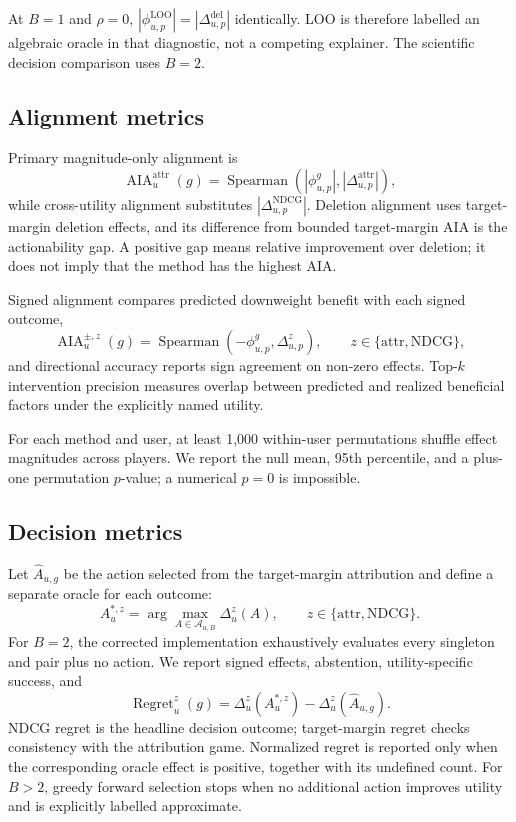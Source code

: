\documentclass[pdflatex,sn-basic]{sn-jnl}
\newcommand{\AIA}{\operatorname{AIA}}
\begin{document}
At $B=1$ and $\rho=0$, $|\phi^{\mathrm{LOO}}_{u,p}|=|\Delta^{\mathrm{del}}_{u,p}|$ identically. LOO is therefore labelled an algebraic oracle in that diagnostic, not a competing explainer. The scientific decision comparison uses $B=2$.

\subsection{Alignment metrics}
Primary magnitude-only alignment is
\begin{equation}
\AIA_u^{\mathrm{attr}}(g)=\operatorname{Spearman}\left(|\phi^g_{u,p}|,|\Delta^{\mathrm{attr}}_{u,p}|\right),
\end{equation}
while cross-utility alignment substitutes $|\Delta^{\mathrm{NDCG}}_{u,p}|$. Deletion alignment uses target-margin deletion effects, and its difference from bounded target-margin AIA is the actionability gap. A positive gap means relative improvement over deletion; it does not imply that the method has the highest AIA.

Signed alignment compares predicted downweight benefit with each signed outcome,
\begin{equation}
\AIA_u^{\pm,z}(g)=\operatorname{Spearman}(-\phi^g_{u,p},\Delta^z_{u,p}),
\qquad z\in\{\mathrm{attr},\mathrm{NDCG}\},
\end{equation}
and directional accuracy reports sign agreement on non-zero effects. Top-$k$ intervention precision measures overlap between predicted and realized beneficial factors under the explicitly named utility.

For each method and user, at least 1,000 within-user permutations shuffle effect magnitudes across players. We report the null mean, 95th percentile, and a plus-one permutation $p$-value; a numerical $p=0$ is impossible.

\subsection{Decision metrics}
Let $\widehat A_{u,g}$ be the action selected from the target-margin attribution and define a separate oracle for each outcome:
\begin{equation}
A_u^{*,z}=\arg\max_{A\in\mathcal A_{u,B}}\Delta_u^z(A),
\qquad z\in\{\mathrm{attr},\mathrm{NDCG}\}.
\end{equation}
For $B=2$, the corrected implementation exhaustively evaluates every singleton and pair plus no action. We report signed effects, abstention, utility-specific success, and
\begin{equation}
\operatorname{Regret}_u^z(g)=\Delta_u^z(A_u^{*,z})-\Delta_u^z(\widehat A_{u,g}).
\end{equation}
NDCG regret is the headline decision outcome; target-margin regret checks consistency with the attribution game. Normalized regret is reported only when the corresponding oracle effect is positive, together with its undefined count. For $B>2$, greedy forward selection stops when no additional action improves utility and is explicitly labelled approximate.
\end{document}
